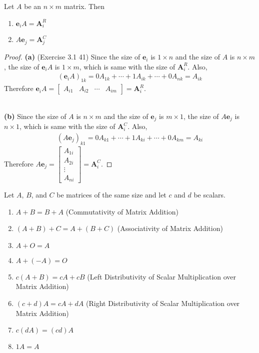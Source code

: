 \begin{theorem}
	Let $A$ be an $n \times m$ matrix. Then
	\begin{enumerate}
		\item $\textbf{e}_iA = \textbf{A}^{R}_i$
		\item $A\textbf{e}_j = \textbf{A}^{C}_j$
	\end{enumerate}
\end{theorem}

\begin{proof}
	\textbf{(a)} (Exercise 3.1 41) Since the size of $\textbf{e}_i$ is $1 \times n$ and the size of $A$ is $n \times m$, the size of $\textbf{e}_iA$ is $1 \times m$, which is same with the size of $\textbf{A}^{R}_i$. Also,
	\begin{align*}
	(\textbf{e}_iA)_{1k} = 0A_{1k} + \cdots + 1A_{ik} + \cdots + 0A_{nk} = A_{ik}
	\end{align*} Therefore $\textbf{e}_iA = \begin{bmatrix}
	A_{i1} & A_{i2} & \cdots & A_{im}
	\end{bmatrix} = \textbf{A}^{R}_i$.
	
	\noindent \\ \textbf{(b)} Since the size of $A$ is $n \times m$ and the size of $\textbf{e}_j$ is $m \times 1$, the size of $A\textbf{e}_j$ is $n \times 1$, which is same with the size of $\textbf{A}^{C}_i$. Also,
	\begin{align*}
	(A\textbf{e}_j)_{k1} = 0A_{k1} + \cdots + 1A_{ki} + \cdots + 0A_{km} = A_{ki}
	\end{align*} Therefore $A\textbf{e}_j = \begin{bmatrix}
	A_{1i} \\ A_{2i} \\ \vdots \\ A_{ni}
	\end{bmatrix} = \textbf{A}^{C}_i$.
\end{proof}

\begin{theorem}
	Let $A$, $B$, and $C$ be matrices of the same size and let $c$ and $d$ be scalars.
	\begin{enumerate}
		\item $A+B = B+A$ (Commutativity of Matrix Addition)
		\item $(A+B)+C = A+(B+C)$ (Associativity of Matrix Addition)
		\item $A+O = A$
		\item $A+(-A) = O$
		\item $c(A+B) = cA+cB$ (Left Distributivity of Scalar Multiplication over Matrix Addition)
		\item $(c+d)A = cA+dA$ (Right Distributivity of Scalar Multiplication over Matrix Addition)
		\item $c(dA) = (cd)A$
		\item $1A = A$
	\end{enumerate}	
\end{theorem}

